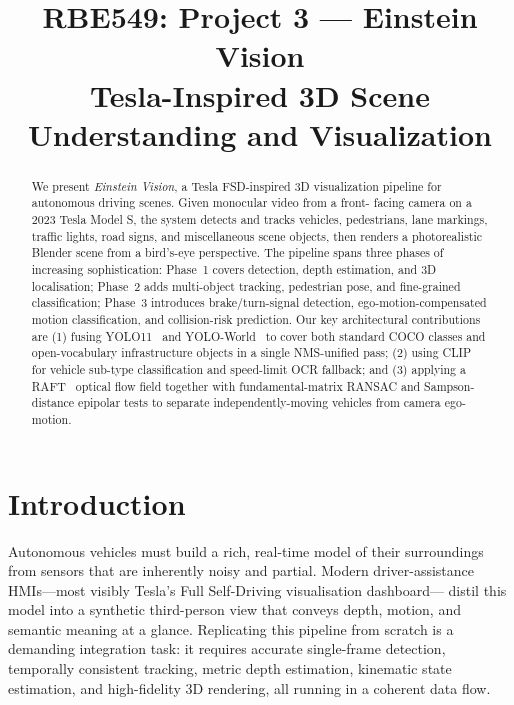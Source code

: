 \documentclass[conference]{IEEEtran}
\title{RBE549: Project 3 --- Einstein Vision\\
\large Tesla-Inspired 3D Scene Understanding and Visualization}
\author{
\IEEEauthorblockN{Nishanth Adithya Chandramouli}
\IEEEauthorblockA{Robotics Engineering\\
Worcester Polytechnic Institute\\
nchandramouli@wpi.edu}
\and
\IEEEauthorblockN{Chaitanya Sriram Gaddipati}
\IEEEauthorblockA{Robotics Engineering\\
Worcester Polytechnic Institute\\
csgaddipati@wpi.edu}
}
\begin{document}
\maketitle

\begin{abstract}
We present \emph{Einstein Vision}, a Tesla FSD-inspired 3D visualization
pipeline for autonomous driving scenes.  Given monocular video from a front-
facing camera on a 2023 Tesla Model S, the system detects and tracks
vehicles, pedestrians, lane markings, traffic lights, road signs, and
miscellaneous scene objects, then renders a photorealistic Blender scene
from a bird's-eye perspective.  The pipeline spans three phases of
increasing sophistication: Phase~1 covers detection, depth estimation, and
3D localisation; Phase~2 adds multi-object tracking, pedestrian pose, and
fine-grained classification; Phase~3 introduces brake/turn-signal
detection, ego-motion-compensated motion classification, and
collision-risk prediction.  Our key architectural contributions are (1)
fusing YOLO11~\cite{ultralytics2024yolo11} and YOLO-World~\cite{cheng2024yoloworld}
to cover both standard COCO classes and open-vocabulary infrastructure
objects in a single NMS-unified pass; (2) using CLIP~\cite{radford2021clip}
for vehicle sub-type classification and speed-limit OCR fallback; and
(3) applying a RAFT~\cite{teed2020raft} optical flow field together with
fundamental-matrix RANSAC and Sampson-distance epipolar tests to separate
independently-moving vehicles from camera ego-motion.
\end{abstract}

\section{Introduction}

Autonomous vehicles must build a rich, real-time model of their surroundings
from sensors that are inherently noisy and partial.  Modern driver-assistance
HMIs---most visibly Tesla's Full Self-Driving visualisation dashboard---
distil this model into a synthetic third-person view that conveys depth,
motion, and semantic meaning at a glance.  Replicating this pipeline from
scratch is a demanding integration task: it requires accurate single-frame
detection, temporally consistent tracking, metric depth estimation,
kinematic state estimation, and high-fidelity 3D rendering, all running
in a coherent data flow.
\end{document}
